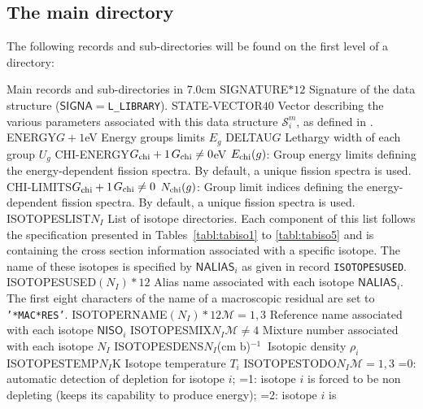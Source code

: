 \goodbreak
\clearpage

\subsection{The main  directory}\label{sect:microlibdirmain}

The following records and sub-directories will be found on the first level of a 
directory:
\begin{DescriptionEnregistrement}{Main records and sub-directories in }{7.0cm}
\CharEnr
  {SIGNATURE}{$*12$}
  {Signature of the  data structure ($\mathsf{SIGNA}=${\tt L\_LIBRARY}).}
\IntEnr
  {STATE-VECTOR}{$40$}
  {Vector describing the various parameters associated with this data structure $\mathcal{S}^{m}_{i}$,
  as defined in .}
\RealEnr
  {ENERGY}{$G+1$}{eV}
  {Energy groups limits $E_{g}$}
\RealEnr
  {DELTAU}{$G$}{}
  {Lethargy width of each group $U_{g}$}
\OptRealEnr
  {CHI-ENERGY}{$G_{\rm chi}+1$}{$G_{\rm chi}\ne 0$}{eV}
  {$E_{\rm chi}(g)$: Group energy limits defining the energy-dependent fission spectra. By default, a unique fission spectra is used.}
\OptIntEnr
  {CHI-LIMITS}{$G_{\rm chi}+1$}{$G_{\rm chi}\ne 0$}
  {$N_{\rm chi}(g)$: Group limit indices defining the energy-dependent fission spectra. By default, a unique fission spectra is used.}
\DirlEnr
  {ISOTOPESLIST}{$N_{I}$}
  {List of {\sc isotope} directories. Each component of this list follows the  specification
  presented in Tables~\ref{tabl:tabiso1} to \ref{tabl:tabiso5} and is containing the cross section
  information associated with a specific isotope. The name of these isotopes is specified by 
  $\mathsf{NALIAS}_{i}$ as given in record {\tt ISOTOPESUSED}.}
\CharEnr
  {ISOTOPESUSED}{$(N_{I})*12$}
  {Alias name associated with each isotope $\mathsf{NALIAS}_{i}$. The first eight characters of the name of a macroscopic residual are set to {\tt '*MAC*RES'}.}
\OptCharEnr
  {ISOTOPERNAME}{$(N_{I})*12$}{$\mathcal{M}=1,3$}
  {Reference name associated with each isotope $\mathsf{NISO}_{i}$}
\OptIntEnr
  {ISOTOPESMIX}{$N_{I}$}{$\mathcal{M}\ne 4$}
  {Mixture number associated with each isotope $N_{I}$}
\RealEnr
  {ISOTOPESDENS}{$N_{I}$}{(cm b)$^{-1}\ $}
  {Isotopic density $\rho_{i}$}
\RealEnr
  {ISOTOPESTEMP}{$N_{I}$}{K}
  {Isotope temperature $T_{i}$}
\OptIntEnr
  {ISOTOPESTODO}{$N_{I}$}{$\mathcal{M}=1,3$}
  {=0: automatic detection of depletion for isotope $i$; =1: isotope $i$ is
  forced to be non depleting (keeps its capability to produce energy); =2: isotope $i$ is
}
\end{DescriptionEnregistrement}
